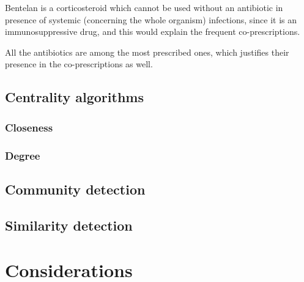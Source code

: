 Bentelan is a corticosteroid which cannot be used without an antibiotic in presence of systemic (concerning the whole organism) infections\cite{bentelan}, since it is an immunosuppressive drug, and this would explain the frequent co-prescriptions.

All the antibiotics are among the most prescribed ones, which justifies their presence in the co-prescriptions as well.

\subsection{Centrality algorithms}

%
%

\subsubsection{Closeness}



\subsubsection{Degree}

\subsection{Community detection}

\subsection{Similarity detection}


\section{Considerations}







